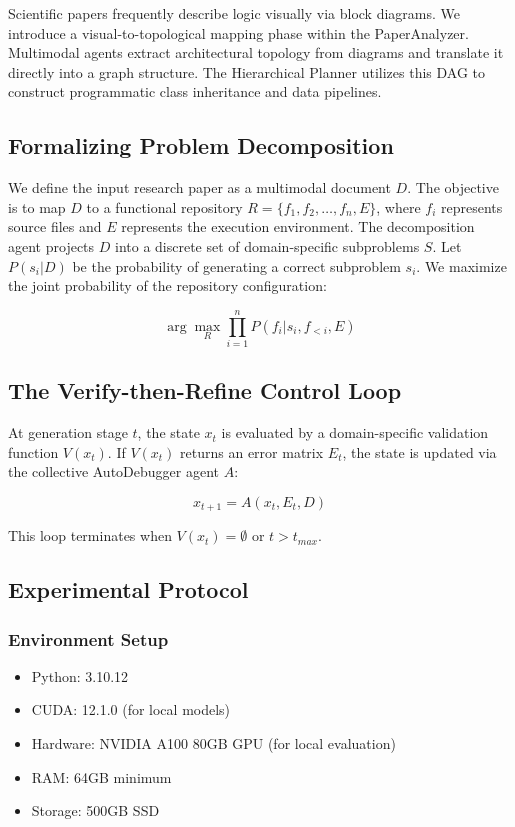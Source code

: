 \documentclass[10pt]{article}
\begin{document}
Scientific papers frequently describe logic visually via block diagrams. We introduce a visual-to-topological mapping phase within the PaperAnalyzer. Multimodal agents extract architectural topology from diagrams and translate it directly into a graph structure. The Hierarchical Planner utilizes this DAG to construct programmatic class inheritance and data pipelines.

\subsection{Formalizing Problem Decomposition}

We define the input research paper as a multimodal document $D$. The objective is to map $D$ to a functional repository $R = \{f_1, f_2, \dots, f_n, E\}$, where $f_i$ represents source files and $E$ represents the execution environment. The decomposition agent projects $D$ into a discrete set of domain-specific subproblems $S$. Let $P(s_i | D)$ be the probability of generating a correct subproblem $s_i$. We maximize the joint probability of the repository configuration:

$$\arg\max_{R} \prod_{i=1}^{n} P(f_i | s_i, f_{<i}, E)$$

\subsection{The Verify-then-Refine Control Loop}

At generation stage $t$, the state $x_t$ is evaluated by a domain-specific validation function $V(x_t)$. If $V(x_t)$ returns an error matrix $E_t$, the state is updated via the collective AutoDebugger agent $A$:

$$x_{t+1} = A(x_t, E_t, D)$$

This loop terminates when $V(x_t) = \emptyset$ or $t > t_{max}$.

\subsection{Experimental Protocol}

\subsubsection{Environment Setup}
\begin{itemize}
    \item Python: 3.10.12
    \item CUDA: 12.1.0 (for local models)
    \item Hardware: NVIDIA A100 80GB GPU (for local evaluation)
    \item RAM: 64GB minimum
    \item Storage: 500GB SSD
\end{itemize}
\end{document}
